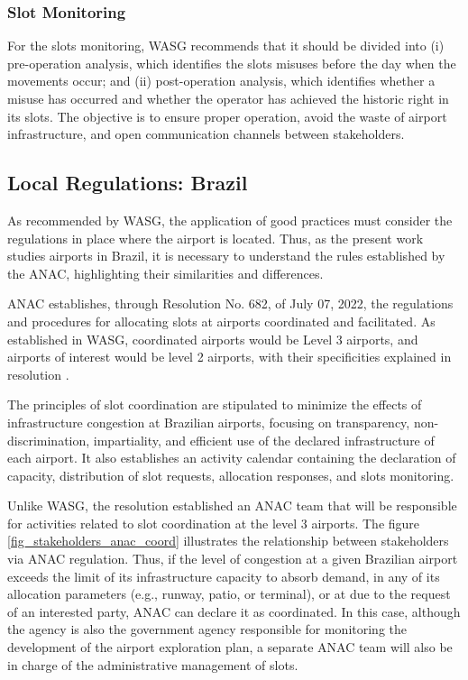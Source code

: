 %

\subsubsection{Slot Monitoring}

For the slots monitoring, \acrshort{WASG} recommends that it should be divided into (i) pre-operation analysis, which identifies the slots misuses before the day when the movements occur; and (ii) post-operation analysis, which identifies whether a misuse has occurred and whether the operator has achieved the historic right in its slots. The objective is to ensure proper operation, avoid the waste of airport infrastructure, and open communication channels between stakeholders.

\subsection{Local Regulations: Brazil}

As recommended by \acrshort{WASG}, the application of good practices must consider the regulations in place where the airport is located. Thus, as the present work studies airports in Brazil, it is necessary to understand the rules established by the \acrshort{ANAC}, highlighting their similarities and differences.

\acrshort{ANAC} establishes, through Resolution No. 682, of July 07, 2022, the regulations and procedures for allocating slots at airports coordinated and facilitated. As established in \acrshort{WASG}, coordinated airports would be Level 3 airports, and airports of interest would be level 2 airports, with their specificities explained in resolution \cite{ANAC682}.

The principles of slot coordination are stipulated to minimize the effects of infrastructure congestion at Brazilian airports, focusing on transparency, non-discrimination, impartiality, and efficient use of the declared infrastructure of each airport. It also establishes an activity calendar containing the declaration of capacity, distribution of slot requests, allocation responses, and slots monitoring.

Unlike \acrshort{WASG}, the resolution established an \acrshort{ANAC} team that will be responsible for activities related to slot coordination at the level 3 airports. The figure \ref{fig_stakeholders_anac_coord} illustrates the relationship between stakeholders via \acrshort{ANAC} regulation. Thus, if the level of congestion at a given Brazilian airport exceeds the limit of its infrastructure capacity to absorb demand, in any of its allocation parameters (e.g., runway, patio, or terminal), or at due to the request of an interested party, \acrshort{ANAC} can declare it as coordinated. In this case, although the agency is also the government agency responsible for monitoring the development of the airport exploration plan, a separate \acrshort{ANAC} team will also be in charge of the administrative management of slots.

